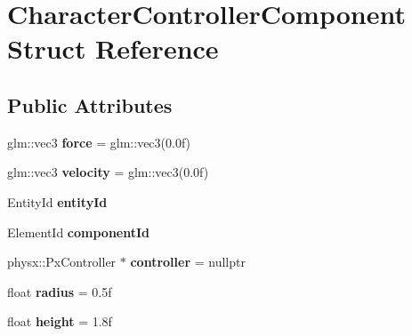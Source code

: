 \hypertarget{struct_character_controller_component}{}\section{Character\+Controller\+Component Struct Reference}
\label{struct_character_controller_component}
\subsection*{Public Attributes}
\begin{DoxyCompactItemize}
\item 
\hypertarget{struct_character_controller_component_ad5abc3869c313e3df7da87ed85b71867}{}glm\+::vec3 {\bfseries force} = glm\+::vec3(0.\+0f)\label{struct_character_controller_component_ad5abc3869c313e3df7da87ed85b71867}

\item 
\hypertarget{struct_character_controller_component_ab9f6e5b90ab313017bb82c4bae1c1078}{}glm\+::vec3 {\bfseries velocity} = glm\+::vec3(0.\+0f)\label{struct_character_controller_component_ab9f6e5b90ab313017bb82c4bae1c1078}

\item 
\hypertarget{struct_character_controller_component_a0385a62a149f136631dc3e48e6771a00}{}Entity\+Id {\bfseries entity\+Id}\label{struct_character_controller_component_a0385a62a149f136631dc3e48e6771a00}

\item 
\hypertarget{struct_character_controller_component_a43b7513a8d1c35d9f33d74bd3a405b87}{}Element\+Id {\bfseries component\+Id}\label{struct_character_controller_component_a43b7513a8d1c35d9f33d74bd3a405b87}

\item 
\hypertarget{struct_character_controller_component_a86a1379146c10658930d3276f0aa31b5}{}physx\+::\+Px\+Controller $\ast$ {\bfseries controller} = nullptr\label{struct_character_controller_component_a86a1379146c10658930d3276f0aa31b5}

\item 
\hypertarget{struct_character_controller_component_ae5032631093c4e7c5ea51b52e701ee32}{}float {\bfseries radius} = 0.\+5f\label{struct_character_controller_component_ae5032631093c4e7c5ea51b52e701ee32}

\item 
\hypertarget{struct_character_controller_component_a608901a7230c233baa8c88b3b42cdc32}{}float {\bfseries height} = 1.\+8f\label{struct_character_controller_component_a608901a7230c233baa8c88b3b42cdc32}


\end{DoxyCompactItemize}
